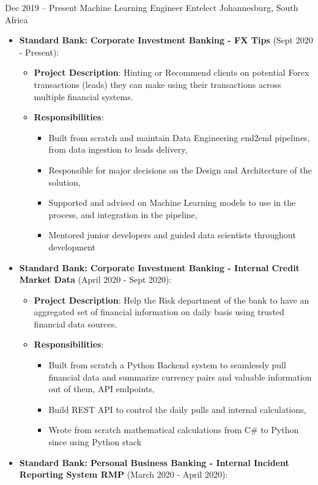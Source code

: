 \documentclass[letterpaper]{moderncv}        %
\begin{document}
\cventry
{Dec 2019 -- Present}
{Machine Learning Engineer}
{Entelect}
{Johannesburg, South Africa}
{}
{\begin{itemize}%
		\item \textbf{Standard Bank: Corporate Investment Banking - FX Tips} (Sept 2020 - Present): 
		\begin{itemize}
			\item \textbf{Project Description}: Hinting or Recommend clients on potential Forex transactions (leads) they can make using their transactions across multiple financial systems. 
			\item \textbf{Responsibilities}:
			\begin{itemize}
				\item Built from scratch and maintain Data Engineering end2end pipelines, from data ingestion to leads delivery,
				\item Responsible for major decisions on the Design and Architecture of the solution,
				\item Supported and advised on Machine Learning models to use in the process, and integration in the pipeline,
				\item Mentored junior developers and guided data scientists throughout development
		\end{itemize}
		\end{itemize}
		\item \textbf{Standard Bank: Corporate Investment Banking - Internal Credit Market Data} (April 2020 - Sept 2020): 
		\begin{itemize}
			\item \textbf{Project Description}: Help the Risk department of the bank to have an aggregated set of financial information on daily basis using trusted financial data sources.
			\item \textbf{Responsibilities}:
			\begin{itemize}
				\item Built from scratch a Python Backend system to seamlessly pull financial data and summarize currency pairs and valuable information out of them, API endpoints,
				\item Build REST API to control the daily pulls and internal calculations,
				\item Wrote from scratch mathematical calculations from C\# to Python since using Python stack
			\end{itemize}
		\end{itemize}
		\item \textbf{Standard Bank: Personal Business Banking - Internal Incident Reporting System RMP} (March 2020 - April 2020): 

\end{itemize}}
\end{document}
